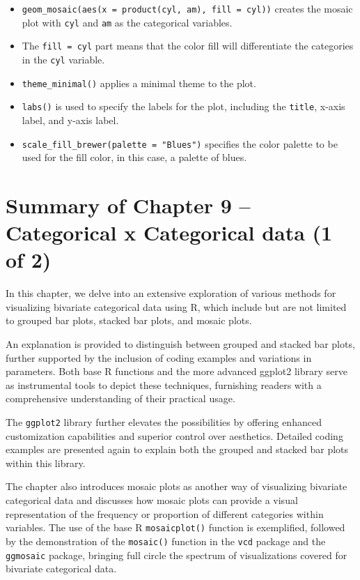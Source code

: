 \documentclass[
  letterpaper,
  DIV=11,
  numbers=noendperiod]{scrreport}
\begin{document}
\begin{itemize}
\item
  \texttt{geom\_mosaic(aes(x\ =\ product(cyl,\ am),\ fill\ =\ cyl))}
  creates the mosaic plot with \texttt{cyl} and \texttt{am} as the
  categorical variables.
\item
  The \texttt{fill\ =\ cyl} part means that the color fill will
  differentiate the categories in the \texttt{cyl} variable.
\item
  \texttt{theme\_minimal()} applies a minimal theme to the plot.
\item
  \texttt{labs()} is used to specify the labels for the plot, including
  the \texttt{title}, x-axis label, and y-axis label.
\item
  \texttt{scale\_fill\_brewer(palette\ =\ "Blues")} specifies the color
  palette to be used for the fill color, in this case, a palette of
  blues.
\end{itemize}

\hypertarget{summary-of-chapter-9-categorical-x-categorical-data-1-of-2}{%
\section{Summary of Chapter 9 -- Categorical x Categorical data (1 of
2)}\label{summary-of-chapter-9-categorical-x-categorical-data-1-of-2}}

In this chapter, we delve into an extensive exploration of various
methods for visualizing bivariate categorical data using R, which
include but are not limited to grouped bar plots, stacked bar plots, and
mosaic plots.

An explanation is provided to distinguish between grouped and stacked
bar plots, further supported by the inclusion of coding examples and
variations in parameters. Both base R functions and the more advanced
ggplot2 library serve as instrumental tools to depict these techniques,
furnishing readers with a comprehensive understanding of their practical
usage.

The \texttt{ggplot2} library further elevates the possibilities by
offering enhanced customization capabilities and superior control over
aesthetics. Detailed coding examples are presented again to explain both
the grouped and stacked bar plots within this library.

The chapter also introduces mosaic plots as another way of visualizing
bivariate categorical data and discusses how mosaic plots can provide a
visual representation of the frequency or proportion of different
categories within variables. The use of the base R \texttt{mosaicplot()}
function is exemplified, followed by the demonstration of the
\texttt{mosaic()} function in the \texttt{vcd} package and the
\texttt{ggmosaic} package, bringing full circle the spectrum of
visualizations covered for bivariate categorical data.
\end{document}
